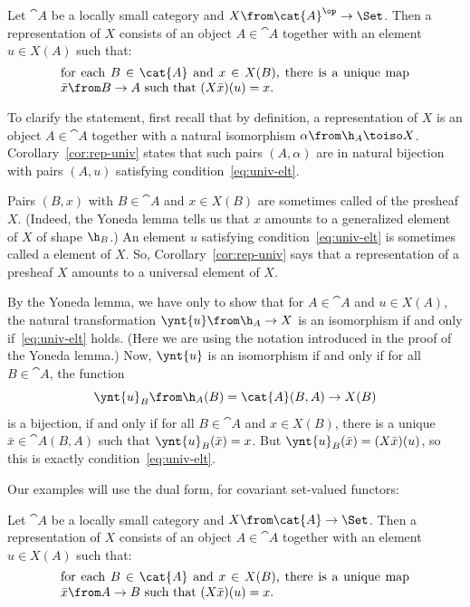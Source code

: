 \begin{cor}
\label{cor:rep-univ}
Let $\cat{A}$ be a locally small category and $X\from \cat{A}^\op \to \Set$.
Then a representation of $X$ consists of an object $A \in \cat{A}$ together
with an element $u \in X(A)$ such that:
% 
\begin{equation}        
\label{eq:univ-elt}
\parbox{.8\textwidth}{%
for each $B \in \cat{A}$ and $x \in X(B)$, there is a unique map $\bar{x}\from
B \to A$ such that $(X\bar{x})(u) = x$.%
}
\end{equation}
% 
\end{cor}
% 
To clarify the statement, first recall that by definition, a representation
of $X$ is an object $A \in \cat{A}$ together with a natural isomorphism
$\alpha\from \h_A \toiso X$.  Corollary~\ref{cor:rep-univ} states that such
pairs $(A, \alpha)$ are in natural bijection with pairs $(A, u)$ satisfying
condition~\eqref{eq:univ-elt}.

Pairs $(B, x)$ with $B \in \cat{A}$ and $x \in X(B)$ are sometimes called
%
%
%
%
of the presheaf $X$.  (Indeed, the Yoneda lemma tells us that $x$ amounts
to a generalized element of $X$ of shape $\h_B$.)  An element $u$
satisfying condition~\eqref{eq:univ-elt} is sometimes called a
%
%
%
%
element of $X$.  So, Corollary~\ref{cor:rep-univ} says that a
representation of a presheaf $X$ amounts to a universal element of $X$.

\begin{pf}
By the Yoneda lemma, we have only to show that for $A \in \cat{A}$ and $u
\in X(A)$, the natural transformation $\ynt{u}\from \h_A \to X$ is an
isomorphism if and only if~\eqref{eq:univ-elt} holds.  (Here we are using
the notation introduced in the proof of the Yoneda lemma.)  Now, $\ynt{u}$
is an isomorphism if and only if for all $B \in \cat{A}$, the function
\[
\ynt{u}_B\from \h_A(B) = \cat{A}(B, A) \to X(B)
\]
is a bijection, if and only if for all $B \in \cat{A}$ and $x \in X(B)$, there
is a unique $\bar{x} \in \cat{A}(B, A)$ such that $\ynt{u}_B(\bar{x}) = x$.
But $\ynt{u}_B(\bar{x}) = (X\bar{x})(u)$, so this is exactly
condition~\eqref{eq:univ-elt}.  
\end{pf}

Our examples will use the dual form, for covariant set-valued functors:

\begin{cor}
\label{cor:rep-univ-dual}
Let $\cat{A}$ be a locally small category and $X\from \cat{A} \to \Set$.  Then
a representation of $X$ consists of an object $A \in \cat{A}$ together with an
element $u \in X(A)$ such that:
% 
\begin{equation}        
\label{eq:univ-elt-dual}
\parbox{.8\textwidth}{%
for each $B \in \cat{A}$ and $x \in X(B)$, there is a unique map $\bar{x}\from
A \to B$ such that $(X\bar{x})(u) = x$.%
}
\end{equation}
% 
\end{cor}

